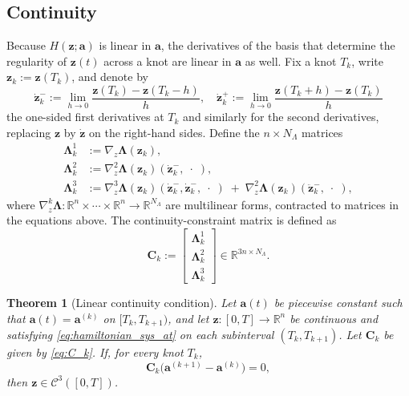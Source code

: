 \documentclass[11pt, a4paper]{article}
\theoremstyle{plain}
\newtheorem{theorem}{Theorem}[section]
\theoremstyle{definition}
\theoremstyle{remark}
\begin{document}
\subsection{Continuity}\label{subsec:continuity}



Because \(H(\mathbf{z};\mathbf{a})\) is linear in \(\mathbf{a}\), the derivatives of the basis that determine the regularity of \(\mathbf{z}(t)\) across a knot are linear in \(\mathbf{a}\) as well. Fix a knot \(T_k\), write \(\mathbf{z}_k:=\mathbf{z}(T_k)\), and denote by
\[\dot{\mathbf{z}}_k^-  := \lim_{h \rightarrow 0} \frac{\mathbf{z}(T_k)- \mathbf{z}(T_k - h)}{h}, \quad   \dot{\mathbf{z}}_k^+ := \lim_{h \rightarrow 0} \frac{\mathbf{z}(T_k + h) - \mathbf{z}(T_k)}{h}\]
the one-sided first derivatives at \(T_k\) and similarly for the second derivatives, replacing $\mathbf{z}$ by $\dot{\mathbf{z}}$ on the right-hand sides. Define the \(n\times N_\Lambda\) matrices
\begin{align*}
\boldsymbol{\Lambda}_k^1 &:= \nabla_z \boldsymbol{\Lambda}(\mathbf{z}_k), \\
\boldsymbol{\Lambda}_k^2 &:= \nabla_z^2 \boldsymbol{\Lambda}(\mathbf{z}_k)\!\left(\dot{\mathbf{z}}_k^-,\;\cdot\;\right), \\
\boldsymbol{\Lambda}_k^3 &:= \nabla_z^3 \boldsymbol{\Lambda}(\mathbf{z}_k)\!\left(\dot{\mathbf{z}}_k^-,\dot{\mathbf{z}}_k^-,\;\cdot\;\right)
\;+\; \nabla_z^2 \boldsymbol{\Lambda}(\mathbf{z}_k)\!\left(\ddot{\mathbf{z}}_k^-,\;\cdot\;\right),
\end{align*}
where $\nabla_z^k \boldsymbol{\Lambda} : \mathbb R^n \times \cdots \times  \mathbb R^n \rightarrow \mathbb R^{N_\Lambda}$ are multilinear forms, contracted to matrices in the equations above.
The continuity-constraint matrix is defined as 
\begin{equation}
\mathbf{C}_k := \begin{bmatrix}
\boldsymbol{\Lambda}_k^1 \\[2pt] \boldsymbol{\Lambda}_k^2 \\[2pt] \boldsymbol{\Lambda}_k^3
\end{bmatrix} \in \mathbb{R}^{3n\times N_\Lambda}.
\label{eq:C_k}
\end{equation}


\begin{theorem}[Linear continuity condition]\label{thm:C3}
Let \(\mathbf{a}(t)\) be piecewise constant such that \(\mathbf{a}(t)=\mathbf{a}^{(k)}\) on \([T_k,T_{k+1})\), and let
\(\mathbf{z}:[0,T]\to\mathbb R^n\) be continuous and satisfying
\eqref{eq:hamiltonian_sys_at} on each subinterval \((T_k,T_{k+1})\).
Let \(\mathbf{C}_k\) be given by \eqref{eq:C_k}. If, for every knot \(T_k\),
\begin{equation}
\mathbf{C}_k\big(\mathbf{a}^{(k+1)}-\mathbf{a}^{(k)}\big)=0,
\label{eq:constraints_C}
\end{equation}
then \(\mathbf{z}\in \mathcal C^3([0,T])\).
\end{theorem}
\end{document}
